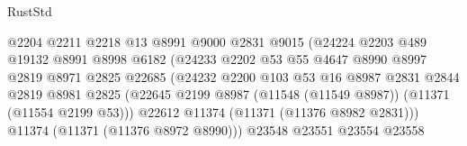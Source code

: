 \begin{lexlean}{RustStd}
\begin{coremodule}
                                        @2204
                                        @2211
                                        @2218
                                        @13
                                        @8991
                                        @9000
                                        @2831
                                        @9015
                                        (@24224
                                          @2203
                                          @489
                                          @19132
                                          @8991
                                          @8998
                                          @6182
                                          (@24233
                                            @2202
                                            @53
                                            @55
                                            @4647
                                            @8990
                                            @8997
                                            @2819
                                            @8971
                                            @2825
                                            @22685
                                            (@24232
                                              @2200
                                              @103
                                              @53
                                              @16
                                              @8987
                                              @2831
                                              @2844
                                              @2819
                                              @8981
                                              @2825
                                              (@22645
                                                @2199
                                                @8987
                                                (@11548 (@11549 @8987))
                                                (@11371 (@11554 @2199 @53)))
                                              @22612
                                              @11374
                                              (@11371 (@11376 @8982 @2831)))
                                            @11374
                                            (@11371 (@11376 @8972 @8990)))
                                          @23548
                                          @23551
                                          @23554
                                          @23558

\end{coremodule}
\end{lexlean}
